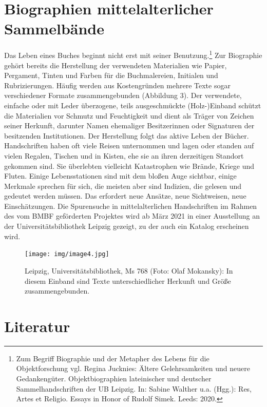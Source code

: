 \documentclass[a4paper,
fontsize=11pt,
oneside,
numbers=noperiodatend,
parskip=half-,
bibliography=totoc,
final
]{scrartcl}
\begin{document}
\hypertarget{biographien-mittelalterlicher-sammelbuxe4nde}{%
\section{Biographien mittelalterlicher
Sammelbände}\label{biographien-mittelalterlicher-sammelbuxe4nde}}

Das Leben eines Buches beginnt nicht erst mit seiner
Benutzung.\footnote{Zum Begriff Biographie und der Metapher des Lebens
  für die Objektforschung vgl. Regina Jucknies: Ältere Gelehrsamkeiten
  und neuere Gedankengüter. Objektbiographien lateinischer und deutscher
  Sammelhandschriften der UB Leipzig. In: Sabine Walther u.a. (Hgg.):
  Res, Artes et Religio. Essays in Honor of Rudolf Simek. Leeds: 2020.}
Zur Biographie gehört bereits die Herstellung der verwendeten
Materialien wie Papier, Pergament, Tinten und Farben für die
Buchmalereien, Initialen und Rubrizierungen. Häufig werden aus
Kostengründen mehrere Texte sogar verschiedener Formate zusammengebunden
(Abbildung 3). Der verwendete, einfache oder mit Leder überzogene, teils
ausgeschmückte (Holz-)Einband schützt die Materialien vor Schmutz und
Feuchtigkeit und dient als Träger von Zeichen seiner Herkunft, darunter
Namen ehemaliger Besitzerinnen oder Signaturen der besitzenden
Institutionen. Der Herstellung folgt das aktive Leben der Bücher.
Handschriften haben oft viele Reisen unternommen und lagen oder standen
auf vielen Regalen, Tischen und in Kisten, ehe sie an ihren derzeitigen
Standort gekommen sind. Sie überlebten vielleicht Katastrophen wie
Brände, Kriege und Fluten. Einige Lebensstationen sind mit dem bloßen
Auge sichtbar, einige Merkmale sprechen für sich, die meisten aber sind
Indizien, die gelesen und gedeutet werden müssen. Das erfordert neue
Ansätze, neue Sichtweisen, neue Einschätzungen. Die Spurensuche in
mittelalterlichen Handschriften im Rahmen des vom BMBF geförderten
Projektes wird ab März 2021 in einer Ausstellung an der
Universitätsbibliothek Leipzig gezeigt, zu der auch ein Katalog
erscheinen wird.

\begin{figure}
\centering
\texttt{[image: img/image4.jpg]}
\caption{Leipzig,
Universitätsbibliothek, Ms 768 (Foto: Olaf Mokansky): In diesem Einband
sind Texte unterschiedlicher Herkunft und Größe zusammengebunden.}
\end{figure}

\hypertarget{literatur}{%
\section{Literatur}\label{literatur}}
\end{document}
